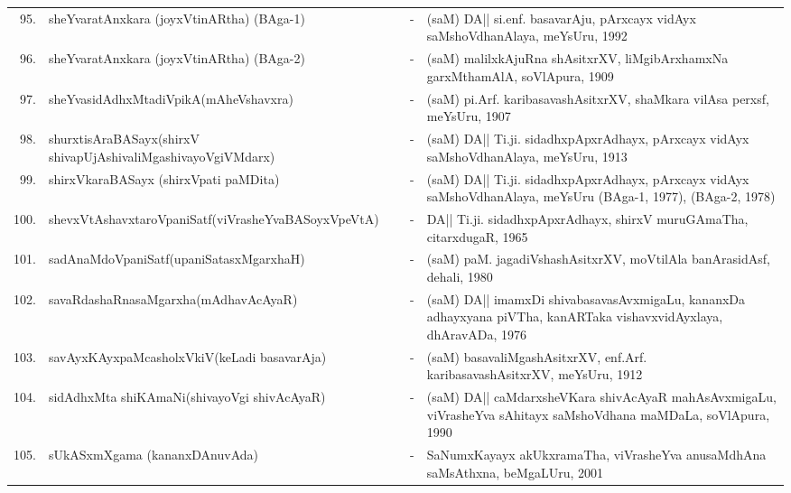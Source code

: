{\begin{longtable}{rp{6cm}cp{9cm}<{\raggedright}}
95. & sheYvaratAnxkara (joyxVtinARtha) (BAga-1) &-& (saM) DA|| si.enf. basavarAju, pArxcayx vidAyx saMshoVdhanAlaya, meYsUru, 1992\\
96. & sheYvaratAnxkara (joyxVtinARtha) (BAga-2) &-& (saM) malilxkAjuRna shAsitxrXV, liMgibArxhamxNa garxMthamAlA, soVlApura, 1909\\
97. & sheYvasidAdhxMtadiVpikA\newline (mAheVshavxra) &-& (saM) pi.Arf. karibasavashAsitxrXV, shaMkara vilAsa perxsf, meYsUru, 1907\\
98. & shurxtisAraBASayx\newline (shirxV shivapUjAshivaliMgashivayoVgiVMdarx) &-& (saM) DA|| Ti.ji. sidadhxpApxrAdhayx, pArxcayx vidAyx saMshoVdhanAlaya, meYsUru, 1913\\
99. & shirxVkaraBASayx (shirxVpati paMDita) &-& (saM) DA|| Ti.ji. sidadhxpApxrAdhayx, pArxcayx vidAyx saMshoVdhanAlaya, meYsUru (BAga-1, 1977), (BAga-2, 1978)\\
100. & shevxVtAshavxtaroVpaniSatf\newline (viVrasheYvaBASoyxVpeVtA) &-& DA|| Ti.ji. sidadhxpApxrAdhayx, shirxV muruGAmaTha, citarxdugaR, 1965\\
101. & sadAnaMdoVpaniSatf\newline (upaniSatasxMgarxhaH) &-& (saM) paM. jagadiVshashAsitxrXV, moVtilAla banArasidAsf, dehali, 1980\\
102. & savaRdashaRnasaMgarxha\newline (mAdhavAcAyaR) &-& (saM) DA|| imamxDi shivabasavasAvxmigaLu, kananxDa adhayxyana piVTha, kanARTaka vishavxvidAyxlaya, dhAravADa, 1976\\
103. & savAyxKAyxpaMcasholxVkiV\newline (keLadi basavarAja) &-& (saM) basavaliMgashAsitxrXV, enf.Arf. karibasavashAsitxrXV, meYsUru, 1912\\
104. & sidAdhxMta shiKAmaNi\newline (shivayoVgi shivAcAyaR) &-& (saM) DA|| caMdarxsheVKara shivAcAyaR mahAsAvxmigaLu, viVrasheYva sAhitayx saMshoVdhana maMDaLa, soVlApura, 1990\\
105. & sUkASxmXgama (kananxDAnuvAda) &-& SaNumxKayayx akUkxramaTha, viVrasheYva anusaMdhAna saMsAthxna, beMgaLUru, 2001\\
\hline
\end{longtable}}


